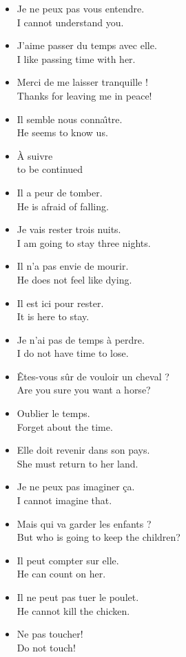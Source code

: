 \begin{itemize}
  \item  Je ne peux pas vous entendre. \\ I cannot understand you.
	\item  J'aime passer du temps avec elle. \\ I like passing time with her.
	\item  Merci de me laisser tranquille ! \\ Thanks for leaving me in peace!
	\item  Il semble nous conna{\^\i}tre. \\ He seems to know us.
	\item  {\`A} suivre \\ to be continued
	\item  Il a peur de tomber. \\ He is afraid of falling.
	\item  Je vais rester trois nuits. \\ I am going to stay three nights.
	\item  Il n'a pas envie de mourir. \\ He does not feel like dying.
	\item  Il est ici pour rester. \\ It is here to stay.
	\item  Je n'ai pas de temps {\`a} perdre. \\ I do not have time to lose.
	\item  {\^E}tes-vous s{\^u}r de vouloir un cheval ? \\ Are you sure you want a horse?
	\item  Oublier le temps. \\ Forget about the time.
	\item  Elle doit revenir dans son pays. \\ She must return to her land.
	\item  Je ne peux pas imaginer {\c c}a. \\ I cannot imagine that.
	\item  Mais qui va garder les enfants ? \\ But who is going to keep the children?
	\item  Il peut compter sur elle. \\ He can count on her.
	\item  Il ne peut pas tuer le poulet. \\ He cannot kill the chicken.
	\item  Ne pas toucher! \\ Do not touch!

\end{itemize}
